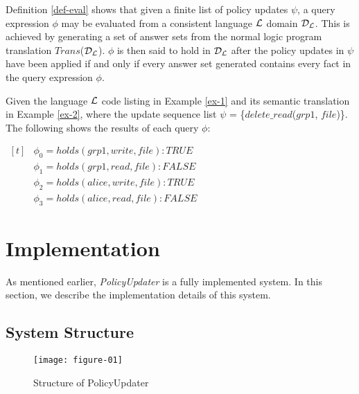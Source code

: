 \documentclass[global,twocolumn,draft]{svjour}
\newenvironment{vexample}
  {\begin{example}\hspace{0.25em}}
  {\end{example}}
\newenvironment{vquote}
  {\begin{list}{}{\leftmargin 1em}\item[]}
  {\end{list}}
\begin{document}
    Definition \ref{def-eval} shows that given a finite list of policy updates
    $\psi$, a query expression $\phi$ may be evaluated from a consistent
    language ${\cal L}$ domain ${\cal D_{L}}$. This is achieved by generating a
    set of answer sets from the normal logic program translation
    $Trans$(${\cal D_{L}}$). $\phi$ is then said to hold in ${\cal D_{L}}$
    after the policy updates in $\psi$ have been applied if and only if every
    answer set generated contains every fact in the query expression $\phi$.

    \begin{vexample}
      \label{ex-3}
      Given the language ${\cal L}$ code listing in Example \ref{ex-1} and its
      semantic translation in Example \ref{ex-2}, where the update sequence
      list $\psi$ = \{$delete\_read$($grp1$, $file$)\}. The following shows the
      results of each query $\phi$:

      \begin{vquote}
        \begin{math}
          \begin{aligned}[t]
            &\phi_{0} = holds(grp1, write, file) : TRUE \\
            &\phi_{1} = holds(grp1, read, file) : FALSE \\
            &\phi_{2} = holds(alice, write, file) : TRUE \\
            &\phi_{3} = holds(alice, read, file) : FALSE
          \end{aligned}
        \end{math}
      \end{vquote}
    \end{vexample}

  \section{Implementation}
    \label{sec-implement}

    As mentioned earlier, {\em PolicyUpdater} is a fully implemented system.
    In this section, we describe the implementation details of this system.

    \subsection{System Structure}

    \begin{figure}[ht]
      \begin{center}
        \texttt{[image: figure-01]}
        \caption{Structure of PolicyUpdater}
        \label{fig-1}
      \end{center}
    \end{figure}
\end{document}
